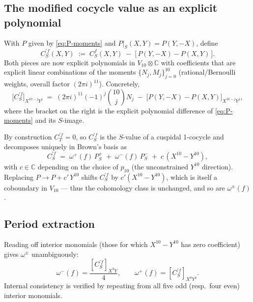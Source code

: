 \documentclass[11pt,letterpaper]{article}
\newcommand{\CC}{\mathbb{C}}
\begin{document}
\subsection{The modified cocycle value as an explicit polynomial}

With $P$ given by \eqref{eq:P-moments} and $P\big|_S(X,Y) = P(Y,-X)$, define
\begin{equation}\label{eq:Cprime-def}
  C^{\prime f}_S(X,Y) \;:=\; C_S^f(X,Y) \;-\; \bigl[\,P(Y,-X) - P(X,Y)\,\bigr].
\end{equation}
Both pieces are now explicit polynomials in $V_{10}\otimes\CC$ with coefficients
that are explicit linear combinations of the moments $\{N_j, M_j\}_{j=0}^{10}$
(rational/Bernoulli weights, overall factor $(2\pi i)^{11}$).  Concretely,
\begin{equation}\label{eq:Cprime-explicit}
  \bigl[C^{\prime f}_S\bigr]_{X^{10-j}Y^j}
  \;=\; (2\pi i)^{11}(-1)^j\binom{10}{j}N_j
        \;-\; \bigl[P(Y,-X) - P(X,Y)\bigr]_{X^{10-j}Y^j},
\end{equation}
where the bracket on the right is the explicit polynomial difference of
\eqref{eq:P-moments} and its $S$-image.

By construction $C^{\prime f}_T = 0$, so $C^{\prime f}_S$ is the $S$-value of
a cuspidal 1-cocycle and decomposes uniquely in Brown's basis as
\begin{equation}\label{eq:decomp}
  C^{\prime f}_S \;=\; \omega^+(f)\,P^+_S \;+\; \omega^-(f)\,P^-_S \;+\; c\,(X^{10} - Y^{10}),
\end{equation}
with $c \in \CC$ depending on the choice of $p_{10}$ (the unconstrained
$Y^{10}$ direction).  Replacing $P \to P + c'\,Y^{10}$ shifts $C^{\prime f}_S$
by $c'(X^{10}-Y^{10})$, which is itself a coboundary in $V_{10}$ — thus the
cohomology class is unchanged, and so are $\omega^\pm(f)$.

\subsection{Period extraction}

Reading off interior monomials (those for which $X^{10}-Y^{10}$ has zero
coefficient) gives $\omega^\pm$ unambiguously:
\begin{equation}\label{eq:extraction}
  \omega^-(f) = \frac{[C^{\prime f}_S]_{X^9 Y}}{4},
  \qquad
  \omega^+(f) = [C^{\prime f}_S]_{X^8 Y^2}.
\end{equation}
Internal consistency is verified by repeating from all five odd (resp.\ four
even) interior monomials.
\end{document}
